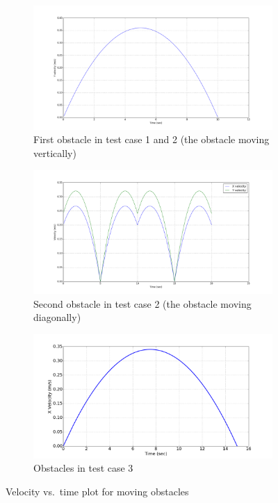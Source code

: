 \begin{figure}[H]
    \centering
    \begin{subfigure}[b]{0.70\linewidth}
    \centering
    \includegraphics[width=0.8\linewidth]{images/velocity_obs_0.png}
    \caption{\label{fig:single_obs_velocity_plot} First obstacle in test case 1 and 2 (the obstacle moving vertically)}
    \end{subfigure}
    \begin{subfigure}[b]{0.70\linewidth}
    \centering
    \includegraphics[width=0.8\linewidth]{images/velocity_obs_1.png}
    \caption{\label{fig:second_obs_velocity_plot} Second obstacle in test case 2 (the obstacle moving diagonally)}
    \end{subfigure}
    \begin{subfigure}[b]{0.70\linewidth}
        \centering
        \includegraphics[width=0.95\linewidth]{images/velocity_obs_2.png}
        \caption{\label{fig:third_obs_velocity_plot} Obstacles in test case 3}
    \end{subfigure}
    \caption{\label{fig:moving_obs_velocity_plots} Velocity vs.\ time plot for moving obstacles}
\end{figure}

